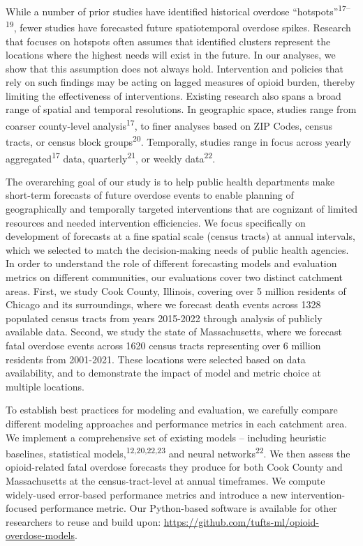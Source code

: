 While a number of prior studies have identified historical overdose ``hotspots''\textsuperscript{17--19}, fewer studies have forecasted future spatiotemporal overdose spikes. Research that focuses on hotspots often assumes that identified clusters represent the locations where the highest needs will exist in the future. In our analyses, we show that this assumption does not always hold. Intervention and policies that rely on such findings may be acting on lagged measures of opioid burden, thereby limiting the effectiveness of interventions. Existing research also spans a broad range of spatial and temporal resolutions. In geographic space, studies range from coarser county-level analysis\textsuperscript{17}, to finer analyses based on ZIP Codes, census tracts, or census block groups\textsuperscript{20}. Temporally, studies range in focus across yearly aggregated\textsuperscript{17} data, quarterly\textsuperscript{21}, or weekly data\textsuperscript{22}.

The overarching goal of our study is to help public health departments make short-term forecasts of future overdose events to enable planning of geographically and temporally targeted interventions that are cognizant of limited resources and needed intervention efficiencies. We focus specifically on development of forecasts at a fine spatial scale (census tracts) at annual intervals, which we selected to match the decision-making needs of public health agencies. In order to understand the role of different forecasting models and evaluation metrics on different communities, our evaluations cover two distinct catchment areas. First, we study Cook County, Illinois, covering over 5 million residents of Chicago and its surroundings, where we forecast death events across 1328 populated census tracts from years 2015-2022 through analysis of publicly available data. Second, we study the state of Massachusetts, where we forecast fatal overdose events across 1620 census tracts representing over 6 million residents from 2001-2021. These locations were selected based on data availability, and to demonstrate the impact of model and metric choice at multiple locations.

To establish best practices for modeling and evaluation, we carefully compare different modeling approaches and performance metrics in each catchment area. We implement a comprehensive set of existing models -- including heuristic baselines, statistical models,\textsuperscript{12,20,22,23} and neural networks\textsuperscript{22}. We then assess the opioid-related fatal overdose forecasts they produce for both Cook County and Massachusetts at the census-tract-level at annual timeframes. We compute widely-used error-based performance metrics and introduce a new intervention-focused performance metric. Our Python-based software is available for other researchers to reuse and build upon: \href{https://github.com/tufts-ml/opioid-overdose-models}{\ul{https://github.com/tufts-ml/opioid-overdose-models}}.


